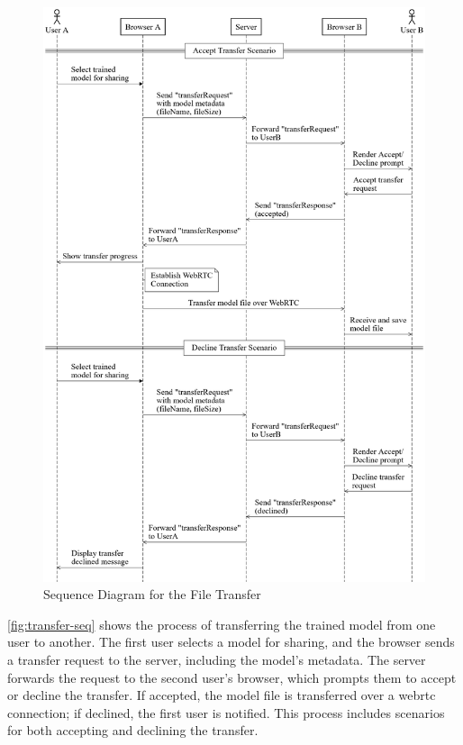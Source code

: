 \begin{figure}[H]
    \centering
    \includegraphics[width=\linewidth]{assets/website/transfer_seq.png}
    \caption{Sequence Diagram for the File Transfer}
    \label{fig:transfer-seq}
\end{figure}
\autoref{fig:transfer-seq} shows the process of transferring the trained model from one user to another. The first user selects a model for sharing, and the browser sends a transfer request to the server, including the model's metadata. The server forwards the request to the second user's browser, which prompts them to accept or decline the transfer. If accepted, the model file is transferred over a \gls{webrtc} connection; if declined, the first user is notified. This process includes scenarios for both accepting and declining the transfer.

